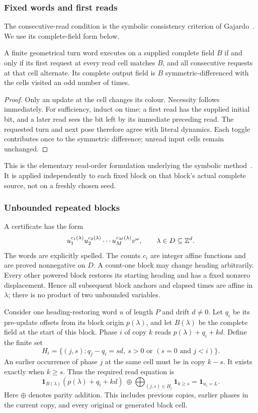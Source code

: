\subsubsection{Fixed words and first reads}
The consecutive-read condition is the symbolic consistency criterion of
Gajardo~\cite[Section~3]{gajardo2003}. We use its complete-field form below.
\begin{lemma}\label{frame:lem:fixed}
A finite geometrical turn word executes on a supplied complete field $B$ if and only if its first request at every read cell matches $B$, and all consecutive requests at that cell alternate. Its complete output field is $B$ symmetric-differenced with the cells visited an odd number of times.
\end{lemma}
\begin{proof}
Only an update at the cell changes its colour. Necessity follows immediately. For sufficiency, induct on time: a first read has the supplied initial bit, and a later read sees the bit left by its immediate preceding read. The requested turn and next pose therefore agree with literal dynamics. Each toggle contributes once to the symmetric difference; unread input cells remain unchanged.
\end{proof}
This is the elementary read-order formulation underlying the symbolic method~\cite{gajardo2003}. It is applied independently to each fixed block on that block's actual complete source, not on a freshly chosen seed.

\subsubsection{Unbounded repeated blocks}
A certificate has the form
\begin{equation}\label{frame:eq:schema}
 u_1^{c_1(\lambda)}u_2^{c_2(\lambda)}\cdots u_M^{c_M(\lambda)}v^\omega,
 \qquad \lambda\in D\subseteq\mathbb Z^d.
\end{equation}
The words are explicitly spelled. The counts $c_i$ are integer affine functions and are proved nonnegative on $D$. A count-one block may change heading arbitrarily. Every other powered block restores its starting heading and has a fixed nonzero displacement. Hence all subsequent block anchors and elapsed times are affine in $\lambda$; there is no product of two unbounded variables.

Consider one heading-restoring word $u$ of length $P$ and drift $d\ne0$. Let $q_i$ be its pre-update offsets from its block origin $p(\lambda)$, and let $B(\lambda)$ be the complete field at the start of this block. Phase $i$ of copy $k$ reads $p(\lambda)+q_i+kd$. Define the finite set
\[
 H_i=\{(j,s):q_j-q_i=sd,\ s>0\text{ or }(s=0\text{ and }j<i)\}.
\]
An earlier occurrence of phase $j$ at the same cell must be in copy $k-s$. It exists exactly when $k\ge s$. Thus the required read equation is
\begin{equation}\label{frame:eq:read}
 \mathbf1_{B(\lambda)}(p(\lambda)+q_i+kd)
 \ \oplus\!\!\bigoplus_{(j,s)\in H_i}\!\!\mathbf1_{k\ge s}
 =\mathbf1_{u_i=L}.
\end{equation}
Here $\oplus$ denotes parity addition. This includes previous copies, earlier phases in the current copy, and every original or generated black cell.

